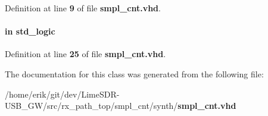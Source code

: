 Definition at line {\bf 9} of file {\bf smpl\+\_\+cnt.\+vhd}.

\paragraph[{trxiqpulse}]{ {\bfseries \textcolor{keywordflow}{in}\textcolor{vhdlchar}{ }} {\bfseries \textcolor{comment}{std\+\_\+logic}\textcolor{vhdlchar}{ }} \hspace{0.3cm}{\ttfamily [Port]}}\label{classsmpl__cnt_a808d6d382f3c6a02784a160f67d0f891}


Definition at line {\bf 25} of file {\bf smpl\+\_\+cnt.\+vhd}.



The documentation for this class was generated from the following file\+:\begin{DoxyCompactItemize}
\item 
/home/erik/git/dev/\+Lime\+S\+D\+R-\/\+U\+S\+B\+\_\+\+G\+W/src/rx\+\_\+path\+\_\+top/smpl\+\_\+cnt/synth/{\bf smpl\+\_\+cnt.\+vhd}\end{DoxyCompactItemize}
